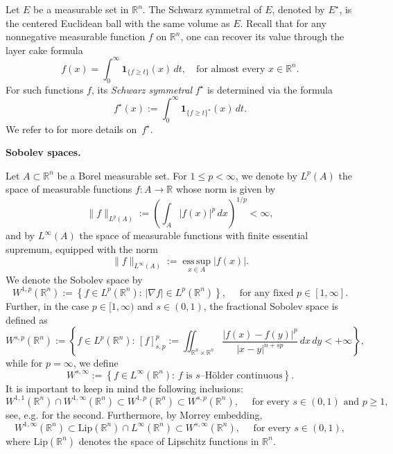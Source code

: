 \documentclass[11pt, reqno]{article}
\theoremstyle{definition}
\numberwithin{equation}{section}
\newcommand{\R}{\mathbb{R}}
\begin{document}
\medskip

Let $E$ be a measurable set in $\R^n$.
The Schwarz symmetral of $E$, denoted by $E^{\star}$, is the centered Euclidean ball with the same volume as $E$.
Recall that for any nonnegative measurable function $f$ on $\R^n$, one can recover its value through the layer cake formula
	\[
		f(x) = \int_0^\infty \pmb{1}_{ \{ f \geq t \}}(x) \, dt, \quad \text{for almost every $x \in \R^n$.
}
	\]
For such functions $f$, its \textit{Schwarz symmetral} $f^\star$ is determined via the formula
	\[
		f^\star(x) := \int_0^\infty \pmb{1}_{ \{ f \geq t \}^\star}(x) \, dt.
	\]
We refer to \cite{B_2009} for more details on~$f^\star$.

\medskip

\textbf{Sobolev spaces.}

\medskip

Let $A \subset \R^n$ be a Borel measurable set.
For \( 1 \leq p < \infty \), we denote by \( L^p(A) \) the space of measurable functions \( f : A \to \mathbb{R} \) whose norm is given by
\[
\|f\|_{L^p(A)} := \left( \int_{A} |f(x)|^p \, dx \right)^{1/p} < \infty,
\]
and by \( L^\infty(A) \) the space of measurable functions with finite essential supremum, equipped with the norm
\[
\|f\|_{L^\infty(A)} := \operatorname*{ess\,sup}_{x \in A} |f(x)|.
\]
We denote the Sobolev space by
	\begin{equation}\label{sobolev}
		W^{1, p}(\R^n) := \left\{ f \in L^p(\R^n): \, | \nabla f | \in L^p(\R^n) \right\}, \quad \text{ for any fixed $p \in [1, \infty]$.}
	\end{equation}
Further, in the case $p \in [1, \infty)$ and $s \in (0, 1)$, the fractional Sobolev space is defined as
	\[
		W^{s, p}(\R^n) := \left\{ f \in L^p(\R^n): \, [f]_{s, p}^p := \iint_{\R^n \times \R^n} \dfrac{|f(x) - f(y)|^p}{|x - y|^{n + sp}} \, dx \, dy < +\infty \right\},
	\]
while  for $p = \infty$, we define
 	\[
		W^{s, \infty} := \left\{ f \in L^\infty(\R^n): \, f \text{ is $s$--H\"older continuous} \right\}.
	\]
It is important to keep in mind the following inclusions:
    \begin{equation}\label{inclu-01}
        W^{1, 1}(\R^n) \cap W^{1, \infty}(\R^n) \subset W^{1, p}(\R^n) \subset W^{s, p}(\R^n), \quad \text{ for every } s \in (0, 1) \text{ and } p \geq 1,
    \end{equation}
see, e.g. \cite[Proposition 2.2]{NPV_2012} for the second.
Furthermore, by Morrey embedding, 
    \begin{equation}\label{inclu-02}
        W^{1, \infty}(\R^n) 
        \subset 
        \mathrm{Lip}(\R^n) \cap L^\infty(\R^n) \subset 
        W^{s, \infty}(\R^n), \quad \text{ for every } s \in (0, 1),
    \end{equation}
where $\mathrm{Lip}(\R^n)$ denotes the space of Lipschitz functions in $\R^n$.
\end{document}
